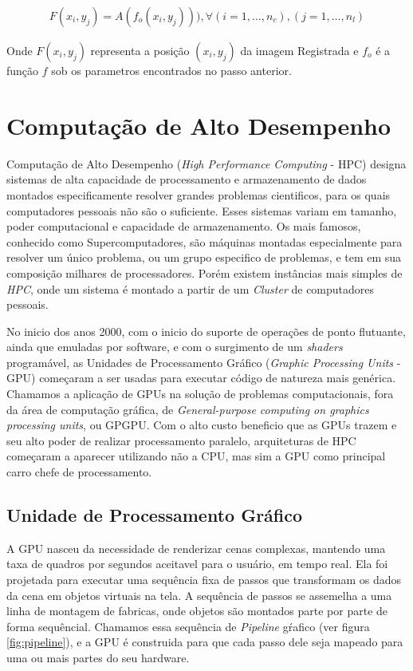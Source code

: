 \begin{align}\label{eq:reamostragem}
    F(x_i,y_j) = A(f_o(x_i,y_j))), \forall (i = 1, \dots, n_c), (j = 1, \dots, n_l)
\end{align}

    Onde $F(x_i,y_j)$ representa a posição $(x_i,y_j)$ da imagem Registrada e $f_o$ é a função $f$ sob os parametros
encontrados no passo anterior.

\section{Computação de Alto Desempenho}\label{GPGPU}
    
    Computação de Alto Desempenho (\textit{High Performance Computing} - HPC) designa sistemas de alta capacidade de processamento
e armazenamento de dados montados especificamente resolver grandes problemas cientificos, para os quais computadores pessoais não
são o suficiente. Esses sistemas variam em tamanho, poder computacional e capacidade de armazenamento. Os mais famosos,
conhecido como Supercomputadores, são máquinas montadas especialmente para resolver um único problema, ou um grupo
especifico de problemas, e tem em sua composição milhares de processadores. Porém existem instâncias mais simples de 
\textit{HPC}, onde um sistema é montado a partir de um \textit{Cluster} de computadores pessoais.

    No inicio dos anos 2000, com o inicio do suporte de operações de ponto flutuante, ainda que emuladas por software, 
e com o surgimento de um \textit{shaders} programável, as Unidades de Processamento Gráfico 
(\textit{Graphic Processing Units} - GPU) começaram a ser usadas para executar código de natureza mais genérica.
Chamamos a aplicação de GPUs na solução de problemas computacionais, fora da área de computação gráfica, 
de \textit{General-purpose computing on graphics processing units}, ou GPGPU. Com o alto custo beneficio que as GPUs 
trazem e seu alto poder de realizar processamento paralelo, arquiteturas de HPC começaram a aparecer utilizando não a 
CPU, mas sim a GPU como principal carro chefe de processamento.

\subsection{Unidade de Processamento Gráfico}
    A GPU nasceu da necessidade de renderizar cenas complexas, mantendo uma taxa de quadros por segundos
aceitavel para o usuário, em tempo real. Ela foi projetada para executar uma sequência fixa de passos que transformam
os dados da cena em objetos virtuais na tela. A sequência de passos se assemelha a uma linha de montagem de fabricas,
onde objetos são montados parte por parte de forma sequêncial. Chamamos essa sequência de \textit{Pipeline} gŕafico 
(ver figura \ref{fig:pipeline}), e a GPU é construida para que cada passo dele seja mapeado para uma ou mais partes do 
seu hardware.

